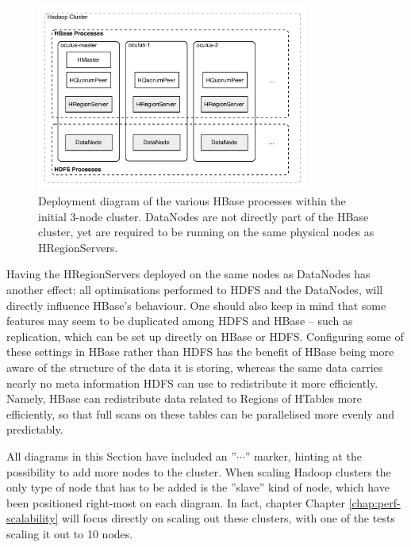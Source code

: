 \begin{figure}[ch!]
  \centering
  \includegraphics[width=0.8\textwidth]{img/hbase-processes}
  \caption{Deployment diagram of the various HBase processes within the initial 3-node cluster. DataNodes are not directly part of the HBase cluster, yet are required to be running on the same physical nodes as HRegionServers.}
  \label{fig:small-cluster-deployment}
\end{figure}

Having the HRegionServers deployed on the same nodes as DataNodes has another effect: all optimisations performed to HDFS and the DataNodes, will directly influence HBase's behaviour. One should also keep in mind that some features may seem to be duplicated among HDFS and HBase -- such as replication, which can be set up directly on HBase or HDFS. Configuring some of these settings in HBase rather than HDFS has the benefit of HBase being more aware of the structure of the data it is storing, whereas the same data carries nearly no meta information HDFS can use to redistribute it more efficiently. 
Namely, HBase can redistribute data related to Regions of HTables more efficiently, so that full scans on these tables can be parallelised more evenly and predictably.

All diagrams in this Section have included an ''$\cdots$'' marker, hinting at the possibility to add more nodes to the cluster. When scaling Hadoop clusters the only type of node that has to be added is the ''slave'' kind of node, which have been positioned right-most on each diagram. In fact, chapter Chapter \ref{chap:perf-scalability} will focus directly on scaling out these clusters, with one of the tests scaling it out to 10 nodes.

